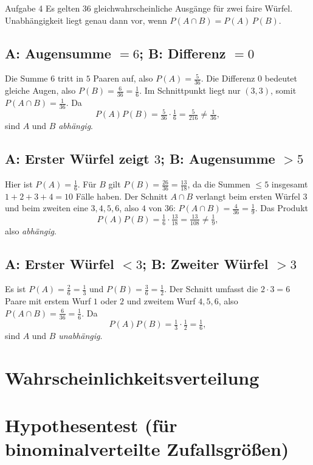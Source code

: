 \documentclass[11pt,a4paper,oneside]{article}
\begin{document}
	\begin{loesung}{Aufgabe 4}
		Es gelten $36$ gleichwahrscheinliche Ausgänge für zwei faire Würfel. Unabhängigkeit liegt genau dann vor, wenn $P(A\cap B)=P(A)\,P(B)$.
		
		\subsection*{A: Augensumme $=6$; B: Differenz $=0$}
		Die Summe $6$ tritt in $5$ Paaren auf, also $P(A)=\tfrac{5}{36}$. Die Differenz $0$ bedeutet gleiche Augen, also $P(B)=\tfrac{6}{36}=\tfrac{1}{6}$. Im Schnittpunkt liegt nur $(3,3)$, somit $P(A\cap B)=\tfrac{1}{36}$. Da 
		\[
		P(A)P(B)=\tfrac{5}{36}\cdot\tfrac{1}{6}=\tfrac{5}{216}\neq \tfrac{1}{36},
		\]
		sind $A$ und $B$ \emph{abhängig}.
		
		\subsection*{A: Erster Würfel zeigt $3$; B: Augensumme $>5$}
		Hier ist $P(A)=\tfrac{1}{6}$. Für $B$ gilt $P(B)=\tfrac{26}{36}=\tfrac{13}{18}$, da die Summen $\le 5$ insgesamt $1+2+3+4=10$ Fälle haben. Der Schnitt $A\cap B$ verlangt beim ersten Würfel $3$ und beim zweiten eine $3,4,5,6$, also $4$ von $36$: $P(A\cap B)=\tfrac{4}{36}=\tfrac{1}{9}$. Das Produkt
		\[
		P(A)P(B)=\tfrac{1}{6}\cdot \tfrac{13}{18}=\tfrac{13}{108}\neq \tfrac{1}{9},
		\]
		also \emph{abhängig}.
		
		\subsection*{A: Erster Würfel $<3$; B: Zweiter Würfel $>3$}
		Es ist $P(A)=\tfrac{2}{6}=\tfrac{1}{3}$ und $P(B)=\tfrac{3}{6}=\tfrac{1}{2}$. Der Schnitt umfasst die $2\cdot 3=6$ Paare mit erstem Wurf $1$ oder $2$ und zweitem Wurf $4,5,6$, also $P(A\cap B)=\tfrac{6}{36}=\tfrac{1}{6}$. Da
		\[
		P(A)P(B)=\tfrac{1}{3}\cdot \tfrac{1}{2}=\tfrac{1}{6},
		\]
		sind $A$ und $B$ \emph{unabhängig}.
	\end{loesung}
	
	
	\section{Wahrscheinlichkeitsverteilung}
	
	\section{Hypothesentest (für binominalverteilte Zufallsgrößen)}
	
\end{document}
